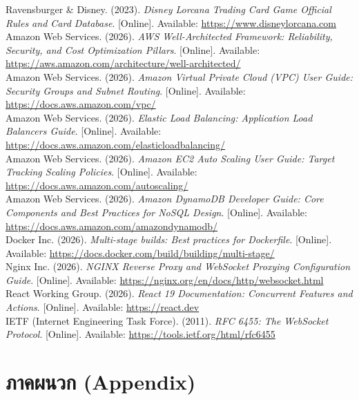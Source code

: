 \documentclass[12pt,a4paper]{report}
\begin{document}
\noindent [1] Ravensburger \& Disney. (2023). \textit{Disney Lorcana Trading Card Game Official Rules and Card Database}. [Online]. Available: \url{https://www.disneylorcana.com}\\[0.3cm]
\noindent [2] Amazon Web Services. (2026). \textit{AWS Well-Architected Framework: Reliability, Security, and Cost Optimization Pillars}. [Online]. Available: \url{https://aws.amazon.com/architecture/well-architected/}\\[0.3cm]
\noindent [3] Amazon Web Services. (2026). \textit{Amazon Virtual Private Cloud (VPC) User Guide: Security Groups and Subnet Routing}. [Online]. Available: \url{https://docs.aws.amazon.com/vpc/}\\[0.3cm]
\noindent [4] Amazon Web Services. (2026). \textit{Elastic Load Balancing: Application Load Balancers Guide}. [Online]. Available: \url{https://docs.aws.amazon.com/elasticloadbalancing/}\\[0.3cm]
\noindent [5] Amazon Web Services. (2026). \textit{Amazon EC2 Auto Scaling User Guide: Target Tracking Scaling Policies}. [Online]. Available: \url{https://docs.aws.amazon.com/autoscaling/}\\[0.3cm]
\noindent [6] Amazon Web Services. (2026). \textit{Amazon DynamoDB Developer Guide: Core Components and Best Practices for NoSQL Design}. [Online]. Available: \url{https://docs.aws.amazon.com/amazondynamodb/}\\[0.3cm]
\noindent [7] Docker Inc. (2026). \textit{Multi-stage builds: Best practices for Dockerfile}. [Online]. Available: \url{https://docs.docker.com/build/building/multi-stage/}\\[0.3cm]
\noindent [8] Nginx Inc. (2026). \textit{NGINX Reverse Proxy and WebSocket Proxying Configuration Guide}. [Online]. Available: \url{https://nginx.org/en/docs/http/websocket.html}\\[0.3cm]
\noindent [9] React Working Group. (2026). \textit{React 19 Documentation: Concurrent Features and Actions}. [Online]. Available: \url{https://react.dev}\\[0.3cm]
\noindent [10] IETF (Internet Engineering Task Force). (2011). \textit{RFC 6455: The WebSocket Protocol}. [Online]. Available: \url{https://tools.ietf.org/html/rfc6455}

\chapter*{ภาคผนวก (Appendix)}
\end{document}
